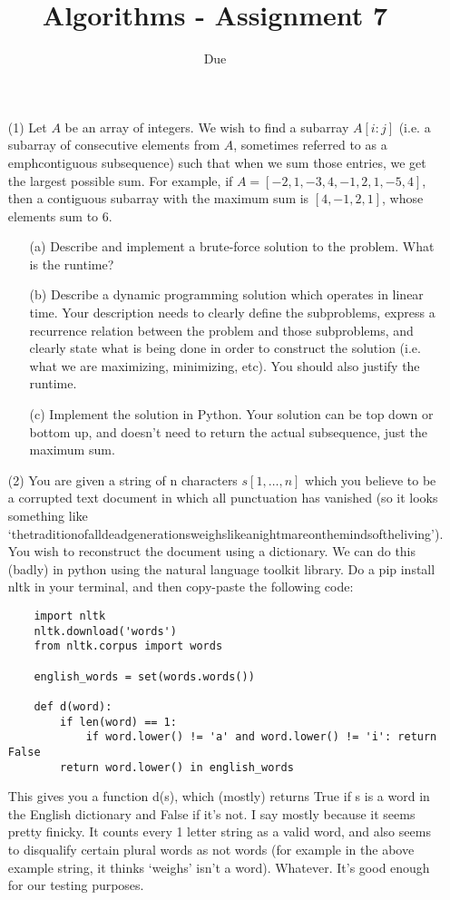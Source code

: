 \documentclass[12pt]{article}
\title{Algorithms - Assignment 7}
\date{Due }
\begin{document}
\maketitle

\begin{enumerate}
    \item[(1)] Let $A$ be an array of integers. We wish to find a subarray $A[i:j]$ (i.e. a subarray of consecutive elements from $A$, sometimes referred to as a 
    emph{contiguous subsequence}) such that when we sum those entries, we get the largest possible sum. For example, if $A=[-2, 1, -3, 4, -1, 2, 1, -5, 4]$, then a contiguous subarray with the maximum sum is $[4,-1,2,1]$, whose elements sum to $6$.
    \begin{itemize}
        \item[(a)] Describe and implement a brute-force solution to the problem. What is the runtime? 
        \item[(b)] Describe a dynamic programming solution which operates in linear time. Your description needs to clearly define the subproblems, express a recurrence relation between the problem and those subproblems, and clearly state what is being done in order to construct the solution (i.e. what we are maximizing, minimizing, etc). You should also justify the runtime. 
        \item[(c)] Implement the solution in Python. Your solution can be top down or bottom up, and doesn't need to return the actual subsequence, just the maximum sum. 
    \end{itemize}
    \item[(2)] You are given a string of n characters $s[1,\ldots,n]$ which you believe to be a corrupted text document in which all punctuation has vanished (so it looks something like `thetraditionofalldeadgenerationsweighslikeanightmareonthemindsoftheliving'). You wish to reconstruct the document using a dictionary. We can do this (badly) in python using the natural language toolkit library. Do a pip install nltk in your terminal, and then copy-paste the following code: 
    \begin{verbatim}
    import nltk
    nltk.download('words')
    from nltk.corpus import words

    english_words = set(words.words())

    def d(word):
	    if len(word) == 1:
		    if word.lower() != 'a' and word.lower() != 'i': return False
	    return word.lower() in english_words
    \end{verbatim}
    This gives you a function d(s), which (mostly) returns True if s is a word in the English dictionary and False if it's not. I say mostly because it seems pretty finicky. It counts every 1 letter string as a valid word, and also seems to disqualify certain plural words as not words (for example in the above example string, it thinks `weighs' isn't a word). Whatever. It's good enough for our testing purposes. 

\end{enumerate}
\end{document}
